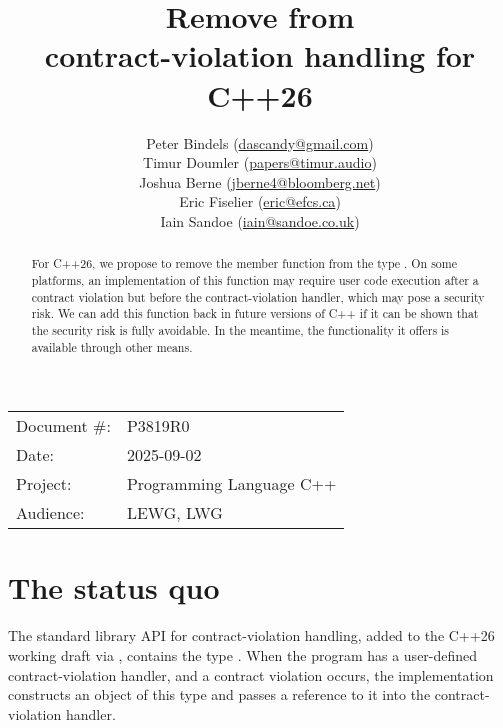 

 \usepackage[bottom]{footmisc} 



\title{Remove  from \\ contract-violation handling for C++26}
\author{
  Peter Bindels \small(\href{mailto:dascandy@gmail.com}{dascandy@gmail.com}) \\
  Timur Doumler \small(\href{mailto:papers@timur.audio}{papers@timur.audio}) \\
  Joshua Berne \small(\href{mailto:jberne4@bloomberg.net}{jberne4@bloomberg.net}) \\ 
  Eric Fiselier \small(\href{mailto:eric@efcs.ca}{eric@efcs.ca}) \\
  Iain Sandoe \small(\href{mailto:iain@sandoe.co.uk}{iain@sandoe.co.uk})
}
\date{}
\maketitle

\begin{tabular}{ll}
Document \#: & P3819R0 \\
Date: &2025-09-02 \\
Project: & Programming Language C++ \\
Audience: & LEWG, LWG
\end{tabular}

\begin{abstract}
For C++26, we propose to remove the member function  from the type . On some platforms, an implementation of this function may require user code execution after a contract violation but before the contract-violation handler, which may pose a security risk. We can add this function back in future versions of C++ if it can be shown that the security risk is fully avoidable. In the meantime, the functionality it offers is available through other means.
\end{abstract}


\section{The status quo}

The standard library API for contract-violation handling, added to the C++26 working draft \cite{N5014} via \cite{P2900R14}, contains the type . When the program has a user-defined contract-violation handler, and a contract violation occurs, the implementation constructs an object of this type and passes a reference to it into the contract-violation handler.

